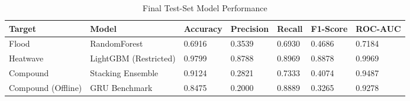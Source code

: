 \begin{table}[t]
\centering
\caption{Final Test-Set Model Performance}
\label{tab:performance}
\begin{tabular}{@{}lllllll@{}}
\toprule
\textbf{Target} & \textbf{Model} & \textbf{Accuracy} & \textbf{Precision} & \textbf{Recall} & \textbf{F1-Score} & \textbf{ROC-AUC} \\
\midrule
Flood & RandomForest & 0.6916 & 0.3539 & 0.6930 & 0.4686 & 0.7184 \\
Heatwave & LightGBM (Restricted) & 0.9799 & 0.8788 & 0.8969 & 0.8878 & 0.9969 \\
Compound & Stacking Ensemble & 0.9124 & 0.2821 & 0.7333 & 0.4074 & 0.9487 \\
Compound (Offline) & GRU Benchmark & 0.8475 & 0.2000 & 0.8889 & 0.3265 & 0.9278 \\
\bottomrule
\end{tabular}
\end{table}